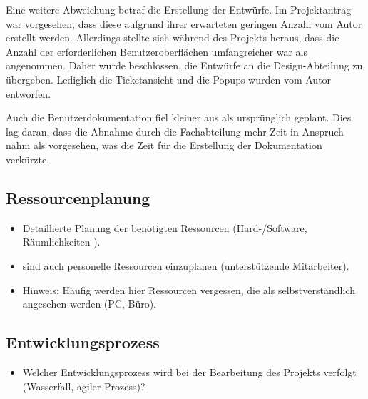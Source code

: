 Eine weitere Abweichung betraf die Erstellung der Entwürfe. Im Projektantrag war vorgesehen, dass diese aufgrund ihrer erwarteten geringen Anzahl vom Autor erstellt werden. Allerdings stellte sich während des Projekts heraus, dass die Anzahl der erforderlichen Benutzeroberflächen umfangreicher war als angenommen. Daher wurde beschlossen, die Entwürfe an die Design-Abteilung zu übergeben. Lediglich die Ticketansicht und die Popups wurden vom Autor entworfen.

Auch die Benutzerdokumentation fiel kleiner aus als ursprünglich geplant. Dies lag daran, dass die Abnahme durch die Fachabteilung mehr Zeit in Anspruch nahm als vorgesehen, was die Zeit für die Erstellung der Dokumentation verkürzte.

\subsection{Ressourcenplanung}
\label{sec:Ressourcenplanung}

\begin{itemize}
	\item Detaillierte Planung der benötigten Ressourcen (Hard-/Software, Räumlichkeiten \usw).
	\item \Ggfs sind auch personelle Ressourcen einzuplanen (\zB unterstützende Mitarbeiter).
	\item Hinweis: Häufig werden hier Ressourcen vergessen, die als selbstverständlich angesehen werden (\zB PC, Büro). 
\end{itemize}


\subsection{Entwicklungsprozess}
\label{sec:Entwicklungsprozess}
\begin{itemize}
	\item Welcher Entwicklungsprozess wird bei der Bearbeitung des Projekts verfolgt (\zB Wasserfall, agiler Prozess)?
\end{itemize}
